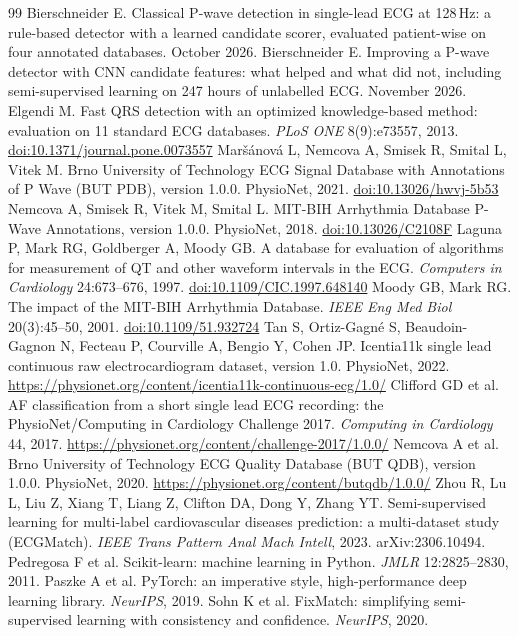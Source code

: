 \documentclass[11pt,a4paper]{article}
\begin{document}
\begin{thebibliography}{99}
 Bierschneider E. Classical P-wave detection in single-lead ECG at 128\,Hz: a rule-based detector with a learned candidate scorer, evaluated patient-wise on four annotated databases. October 2026.
 Bierschneider E. Improving a P-wave detector with CNN candidate features: what helped and what did not, including semi-supervised learning on 247 hours of unlabelled ECG. November 2026.
 Elgendi M. Fast QRS detection with an optimized knowledge-based method: evaluation on 11 standard ECG databases. \emph{PLoS ONE} 8(9):e73557, 2013. \href{https://doi.org/10.1371/journal.pone.0073557}{doi:10.1371/journal.pone.0073557}
 Maršánová L, Nemcova A, Smisek R, Smital L, Vitek M. Brno University of Technology ECG Signal Database with Annotations of P Wave (BUT PDB), version 1.0.0. PhysioNet, 2021. \href{https://doi.org/10.13026/hwvj-5b53}{doi:10.13026/hwvj-5b53}
 Nemcova A, Smisek R, Vitek M, Smital L. MIT-BIH Arrhythmia Database P-Wave Annotations, version 1.0.0. PhysioNet, 2018. \href{https://doi.org/10.13026/C2108F}{doi:10.13026/C2108F}
 Laguna P, Mark RG, Goldberger A, Moody GB. A database for evaluation of algorithms for measurement of QT and other waveform intervals in the ECG. \emph{Computers in Cardiology} 24:673--676, 1997. \href{https://doi.org/10.1109/CIC.1997.648140}{doi:10.1109/CIC.1997.648140}
 Moody GB, Mark RG. The impact of the MIT-BIH Arrhythmia Database. \emph{IEEE Eng Med Biol} 20(3):45--50, 2001. \href{https://doi.org/10.1109/51.932724}{doi:10.1109/51.932724}
 Tan S, Ortiz-Gagné S, Beaudoin-Gagnon N, Fecteau P, Courville A, Bengio Y, Cohen JP. Icentia11k single lead continuous raw electrocardiogram dataset, version 1.0. PhysioNet, 2022. \url{https://physionet.org/content/icentia11k-continuous-ecg/1.0/}
 Clifford GD et al. AF classification from a short single lead ECG recording: the PhysioNet/Computing in Cardiology Challenge 2017. \emph{Computing in Cardiology} 44, 2017. \url{https://physionet.org/content/challenge-2017/1.0.0/}
 Nemcova A et al. Brno University of Technology ECG Quality Database (BUT QDB), version 1.0.0. PhysioNet, 2020. \url{https://physionet.org/content/butqdb/1.0.0/}
 Zhou R, Lu L, Liu Z, Xiang T, Liang Z, Clifton DA, Dong Y, Zhang YT. Semi-supervised learning for multi-label cardiovascular diseases prediction: a multi-dataset study (ECGMatch). \emph{IEEE Trans Pattern Anal Mach Intell}, 2023. arXiv:2306.10494.
 Pedregosa F et al. Scikit-learn: machine learning in Python. \emph{JMLR} 12:2825--2830, 2011.
 Paszke A et al. PyTorch: an imperative style, high-performance deep learning library. \emph{NeurIPS}, 2019.
 Sohn K et al. FixMatch: simplifying semi-supervised learning with consistency and confidence. \emph{NeurIPS}, 2020.
\end{thebibliography}
\end{document}
